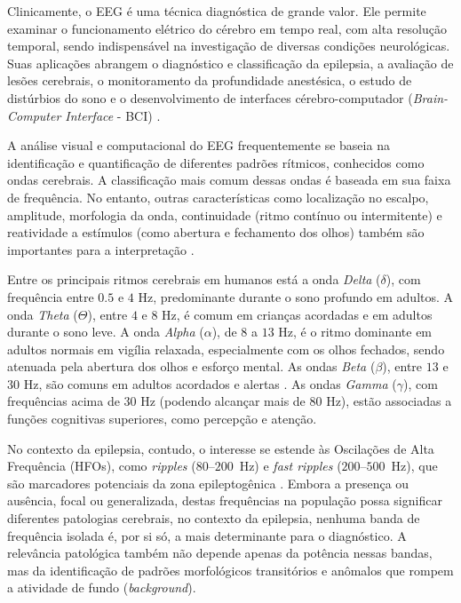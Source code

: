 \documentclass[alpha-refs,brazilian]{CC-EC_TF-TC}
\begin{document}
Clinicamente, o EEG é uma técnica diagnóstica de grande valor. Ele permite examinar o funcionamento elétrico do cérebro em tempo real, com alta resolução temporal, sendo indispensável na investigação de diversas condições neurológicas. Suas aplicações abrangem o diagnóstico e classificação da epilepsia, a avaliação de lesões cerebrais, o monitoramento da profundidade anestésica, o estudo de distúrbios do sono e o desenvolvimento de interfaces cérebro-computador (\textit{Brain-Computer Interface} - BCI) \citep{Qi2020}.

A análise visual e computacional do EEG frequentemente se baseia na identificação e quantificação de diferentes padrões rítmicos, conhecidos como ondas cerebrais. A classificação mais comum dessas ondas é baseada em sua faixa de frequência. No entanto, outras características como localização no escalpo, amplitude, morfologia da onda, continuidade (ritmo contínuo ou intermitente) e reatividade a estímulos (como abertura e fechamento dos olhos) também são importantes para a interpretação \citep{Schomer2018}.

Entre os principais ritmos cerebrais em humanos está a onda \textit{Delta} ($\delta$), com frequência entre $0.5$ e $4$ Hz, predominante durante o sono profundo em adultos. A onda \textit{Theta} ($\Theta$), entre $4$ e $8$ Hz, é comum em crianças acordadas e em adultos durante o sono leve. A onda \textit{Alpha} ($\alpha$), de $8$ a $13$ Hz, é o ritmo dominante em adultos normais em vigília relaxada, especialmente com os olhos fechados, sendo atenuada pela abertura dos olhos e esforço mental. As ondas \textit{Beta} ($\beta$), entre $13$ e $30$ Hz, são comuns em adultos acordados e alertas \citep{Teplan2002}. As ondas \textit{Gamma} ($\gamma$), com frequências acima de $30$ Hz (podendo alcançar mais de $80$ Hz), estão associadas a funções cognitivas superiores, como percepção e atenção.

No contexto da epilepsia, contudo, o interesse se estende às Oscilações de Alta Frequência (HFOs), como \textit{ripples} ($80$--$200$~Hz) e \textit{fast ripples} ($200$--$500$~Hz), que são marcadores potenciais da zona epileptogênica \citep{Pfurtscheller1999, Schomer2018, Husain2023, Engel2024}. Embora a presença ou ausência, focal ou generalizada, destas frequências na população possa significar diferentes patologias cerebrais, no contexto da epilepsia, nenhuma banda de frequência isolada é, por si só, a mais determinante para o diagnóstico. A relevância patológica também não depende apenas da potência nessas bandas, mas da identificação de padrões morfológicos transitórios e anômalos que rompem a atividade de fundo (\textit{background}).
\end{document}
